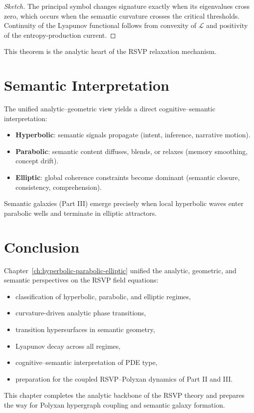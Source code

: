 \begin{proof}[Sketch]
The principal symbol changes signature exactly when its eigenvalues
cross zero, which occurs when the semantic curvature crosses the critical
thresholds.  
Continuity of the Lyapunov functional follows from convexity of $\mathcal{L}$
and positivity of the entropy-production current.
\end{proof}

This theorem is the analytic heart of the RSVP relaxation mechanism.

\section{Semantic Interpretation}

The unified analytic–geometric view yields a direct cognitive–semantic
interpretation:

\begin{itemize}
\item \textbf{Hyperbolic}: semantic signals propagate (intent, inference, narrative motion).  
\item \textbf{Parabolic}: semantic content diffuses, blends, or relaxes (memory smoothing, concept drift).  
\item \textbf{Elliptic}: global coherence constraints become dominant (semantic closure, consistency, comprehension).  
\end{itemize}

Semantic galaxies (Part III) emerge precisely when local hyperbolic waves
enter parabolic wells and terminate in elliptic attractors.

\section{Conclusion}

Chapter~\ref{ch:hyperbolic-parabolic-elliptic} unified the analytic,
geometric, and semantic perspectives on the RSVP field equations:
\begin{itemize}
\item classification of hyperbolic, parabolic, and elliptic regimes,
\item curvature-driven analytic phase transitions,
\item transition hypersurfaces in semantic geometry,
\item Lyapunov decay across all regimes,
\item cognitive–semantic interpretation of PDE type,
\item preparation for the coupled RSVP–Polyxan dynamics of Part II and III.
\end{itemize}

This chapter completes the analytic backbone of the RSVP theory and
prepares the way for Polyxan hypergraph coupling and semantic galaxy formation.

